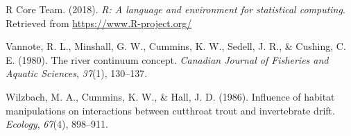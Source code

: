 \documentclass[double,12pt]{beavtex}
\begin{document}
  \hypertarget{ref-R-base}{}
  R Core Team. (2018). \emph{R: A language and environment for statistical
  computing}. Retrieved from \url{https://www.R-project.org/}
  
  \hypertarget{ref-Vannote1980}{}
  Vannote, R. L., Minshall, G. W., Cummins, K. W., Sedell, J. R., \&
  Cushing, C. E. (1980). The river continuum concept. \emph{Canadian
  Journal of Fisheries and Aquatic Sciences}, \emph{37}(1), 130--137.
  
  \hypertarget{ref-Wilzbach1986}{}
  Wilzbach, M. A., Cummins, K. W., \& Hall, J. D. (1986). Influence of
  habitat manipulations on interactions between cutthroat trout and
  invertebrate drift. \emph{Ecology}, \emph{67}(4), 898--911.
\end{document}
